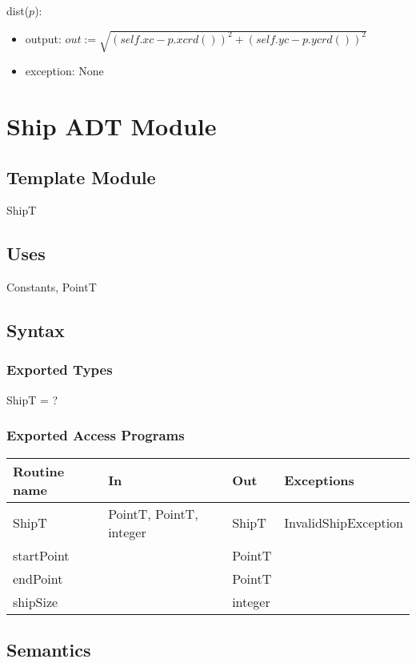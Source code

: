 \documentclass[12pt]{article}
\begin{document}
\noindent dist($p$):
\begin{itemize}
\item output: $out := \sqrt{(\mathit{self}.xc - p.xcrd())^2 + (\mathit{self}.yc - p.ycrd())^2}$
\item exception: None
\end{itemize}

\newpage

\section* {Ship ADT Module}

\subsection*{Template Module}

ShipT

\subsection* {Uses}

Constants, PointT

\subsection* {Syntax}

\subsubsection* {Exported Types}

ShipT = ?

\subsubsection* {Exported Access Programs}

\begin{tabular}{| l | l | l | l |}
\hline
\textbf{Routine name} & \textbf{In} & \textbf{Out} & \textbf{Exceptions}\\
\hline
ShipT & PointT, PointT, integer & ShipT & InvalidShipException\\
\hline
startPoint & ~ & PointT & ~\\
\hline
endPoint & ~ & PointT & ~\\
\hline
shipSize & ~ & integer & ~\\
\hline
\end{tabular}

\subsection* {Semantics}
\end{document}
